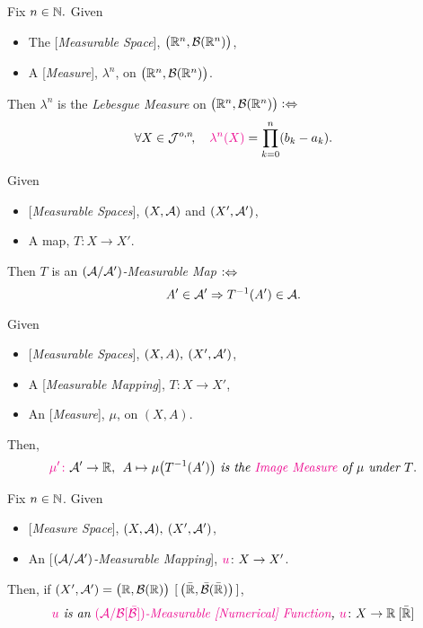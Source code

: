 \begin{definition}\label{def:lmeasure}
Fix $n \in \mathbb{N}.$ Given 
\begin{itemize}
\item
	The [\emph{Measurable Space}], $\bigl(\mathbb{R}^n, \mathcal{B}(\mathbb{R}^n)\bigr)$,
\item
	A [\emph{Measure}], $\lambda^n$, on $\bigl(\mathbb{R}^n, \mathcal{B}(\mathbb{R}^n)\bigr)$.
\end{itemize}
Then {\color{Magenta}$\lambda^n$} is the {\color{Magenta}\emph{Lebesgue Measure}} on $\bigl(\mathbb{R}^n, \mathcal{B}(\mathbb{R}^n)\bigr) \mathrel{\vcentcolon\Leftrightarrow}$ 
$$\forall X \in \J\!, \quad {\color{Magenta}\lambda^n(X)} = \prod_{k=0}^n(b_k - a_k).$$
\end{definition}

\begin{definition}\label{def:mmap}
Given
\begin{itemize}
\item
	[\emph{Measurable Spaces}], $(X, \mathcal{A})$ and $(X', \mathcal{A}')$,
\item
	A map, $T\colon X \rightarrow X'$.
\end{itemize}
Then {\color{Magenta}$T$} is an {\color{Magenta}\emph{$(\mathcal{A}/\mathcal{A}')$-Measurable Map}} $\mathrel{\vcentcolon\Leftrightarrow}$
$$ A' \in \mathcal{A}' \Rightarrow T^{-1}(A') \in \mathcal{A}.$$
\end{definition}

\begin{definition}\label{def:imeasure}
Given
\begin{itemize}
\item
	[\emph{Measurable Spaces}], $(X, A), \> (X', \mathcal{A}')$,
\item
	A [\emph{Measurable Mapping}], $T\colon X \rightarrow X'$,
\item
	An [\emph{Measure}], $\mu$, on $(X, A)$.
\end{itemize}
Then,
$${\color{magenta}\mu'\colon} \A' \rightarrow \R, \>\> A \mapsto \mu\bigl({T}^{-1}(A')\bigr) \text{\it\ is the {\color{Magenta}Image Measure} of $\mu$ under {$T$}}.$$
\end{definition}

\begin{definition}\label{def:mfun}
Fix $n \in \mathbb{N}$. Given
\begin{itemize}
\item
	[\emph{Measure Space}], $(X, \mathcal{A}), \> (X', \mathcal{A}')$,
\item
	An [\emph{$(\mathcal{A}/\mathcal{A}')$-Measurable Mapping}], ${\color{Magenta}u}\colon X \rightarrow X'$.
\end{itemize}
Then, if $(X', \mathcal{A}') = \bigl(\mathbb{R}, \mathcal{B}(\mathbb{R})\bigr) \>\, [\,\bigl(\bar {\mathbb{R}}, \bar {\mathcal{B}}(\bar {\mathbb{R}})\bigr)\,]$,
$${\color{Magenta}u} \text{\it\ is an {\color{Magenta}$(\A/\B [\eB])$-Measurable [Numerical] Function}, } {\color{Magenta}u}\colon X \rightarrow \R \> [\eR]$$
\end{definition}

